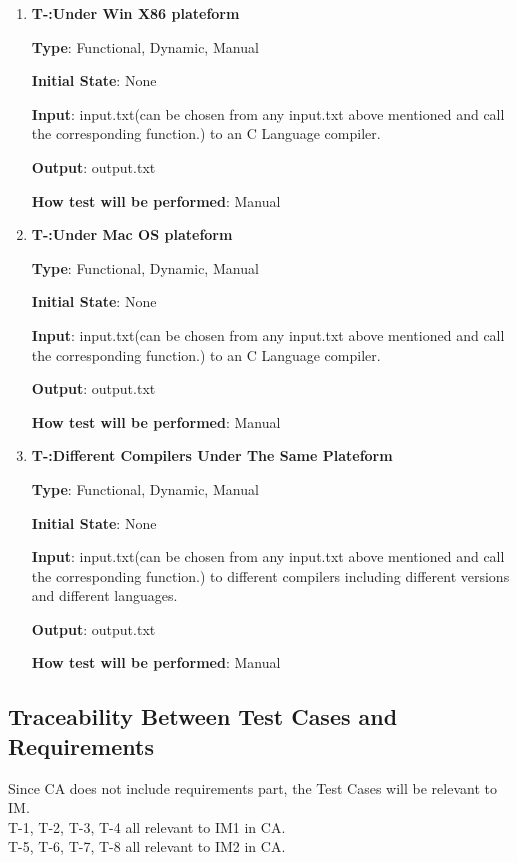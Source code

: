 \documentclass[12pt, titlepage]{article}
\newcounter{tnum}
\begin{document}
\begin{enumerate}

\item{\textbf{T-\thetnum \label{Win86}:Under Win X86 plateform}}

\textbf {Type}: Functional, Dynamic, Manual
					
\textbf {Initial State}: None
					
\textbf {Input}: input.txt(can be chosen from any input.txt above mentioned and call the corresponding function.) to an C Language compiler.
					
\textbf {Output}: output.txt
					
\textbf {How test will be performed}: Manual


\item{\textbf{T-\thetnum \label{Mac}:Under Mac OS plateform}}

\textbf {Type}: Functional, Dynamic, Manual
					
\textbf {Initial State}: None
					
\textbf {Input}:  input.txt(can be chosen from any input.txt above mentioned and call the corresponding function.) to an C Language compiler.
					
\textbf {Output}: output.txt
					
\textbf {How test will be performed}: Manual


\item{\textbf{T-\thetnum \label{Compilers}:Different Compilers Under The Same Plateform}}

\textbf {Type}: Functional, Dynamic, Manual
					
\textbf {Initial State}: None
					
\textbf {Input}:  input.txt(can be chosen from any input.txt above mentioned and call the corresponding function.) to different compilers including different versions and different languages.
					
\textbf {Output}: output.txt
					
\textbf {How test will be performed}: Manual


\end{enumerate}


\subsection{Traceability Between Test Cases and Requirements}
Since CA does not include requirements part, the Test Cases will be relevant to IM.\\
T-1, T-2, T-3, T-4 all relevant to IM1 in CA.\\
T-5, T-6, T-7, T-8 all relevant to IM2 in CA.\\			
\end{document}
